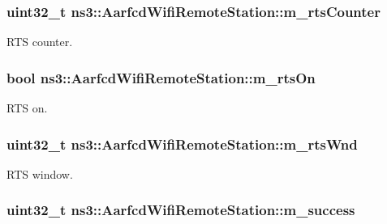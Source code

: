 \subsubsection[{\texorpdfstring{m\+\_\+rts\+Counter}{m_rtsCounter}}]{\setlength{\rightskip}{0pt plus 5cm}uint32\+\_\+t ns3\+::\+Aarfcd\+Wifi\+Remote\+Station\+::m\+\_\+rts\+Counter}\hypertarget{structns3_1_1AarfcdWifiRemoteStation_a137531633d20efc5c502d29326d65470}{}\label{structns3_1_1AarfcdWifiRemoteStation_a137531633d20efc5c502d29326d65470}


R\+TS counter. 

\subsubsection[{\texorpdfstring{m\+\_\+rts\+On}{m_rtsOn}}]{\setlength{\rightskip}{0pt plus 5cm}bool ns3\+::\+Aarfcd\+Wifi\+Remote\+Station\+::m\+\_\+rts\+On}\hypertarget{structns3_1_1AarfcdWifiRemoteStation_ab9c2e6f3f94dd2adebdd8b03eb6db728}{}\label{structns3_1_1AarfcdWifiRemoteStation_ab9c2e6f3f94dd2adebdd8b03eb6db728}


R\+TS on. 

\subsubsection[{\texorpdfstring{m\+\_\+rts\+Wnd}{m_rtsWnd}}]{\setlength{\rightskip}{0pt plus 5cm}uint32\+\_\+t ns3\+::\+Aarfcd\+Wifi\+Remote\+Station\+::m\+\_\+rts\+Wnd}\hypertarget{structns3_1_1AarfcdWifiRemoteStation_a9dfe63f0b12e0809cafbabbe1e1af3e2}{}\label{structns3_1_1AarfcdWifiRemoteStation_a9dfe63f0b12e0809cafbabbe1e1af3e2}


R\+TS window. 

\subsubsection[{\texorpdfstring{m\+\_\+success}{m_success}}]{\setlength{\rightskip}{0pt plus 5cm}uint32\+\_\+t ns3\+::\+Aarfcd\+Wifi\+Remote\+Station\+::m\+\_\+success}\hypertarget{structns3_1_1AarfcdWifiRemoteStation_a87a9f7bd4782c9189bd31c3faf356905}{}\label{structns3_1_1AarfcdWifiRemoteStation_a87a9f7bd4782c9189bd31c3faf356905}


